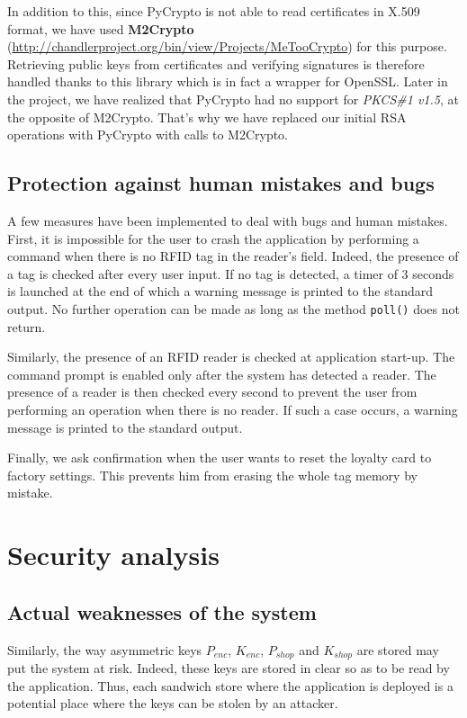 \documentclass[a4paper,11pt,oneside]{article}
\begin{document}
In addition to this, since PyCrypto is not able to read certificates in X.509
format, we have used \textbf{M2Crypto}
(\url{http://chandlerproject.org/bin/view/Projects/MeTooCrypto}) for this
purpose. Retrieving public keys from certificates and verifying signatures is
therefore handled thanks to this library which is in fact a wrapper for OpenSSL. 
Later in the project, we have realized that PyCrypto had no support for
\textit{PKCS\#1
v1.5}, at the opposite of M2Crypto. That's why we have replaced our initial RSA
operations with PyCrypto with calls to M2Crypto.

\subsection{Protection against human mistakes and bugs}

A few measures have been implemented to deal with bugs and human mistakes.
First, it is impossible for the user to crash the application by performing a
command when there is no RFID tag in the reader's field. Indeed, the presence of
a tag is checked after every user input. If no tag is detected, a timer of 3
seconds is launched at the end of which a warning message is printed to the
standard output. No further operation can be made as long as the method
\texttt{poll()}
does not return. 

Similarly, the presence of an RFID reader is checked at application start-up.
The command prompt is enabled only after the system has detected a reader. The
presence of a reader is then checked every second to prevent the user from
performing an operation when there is no reader. If such a case occurs, a
warning message is printed to the standard output. 

Finally, we ask confirmation when the user wants to reset the loyalty card to factory settings. This prevents him from erasing the whole tag memory by mistake.  


\newpage
\section{Security analysis}

\subsection{Actual weaknesses of the system}

Similarly, the way asymmetric keys $P_{enc}$, $K_{enc}$, $P_{shop}$ and
$K_{shop}$ are stored may put the system at risk. Indeed, these keys are stored
in clear so as to be read by the application. Thus, each sandwich store where
the application is deployed is a potential place where the keys can be stolen by
an attacker.
\end{document}
